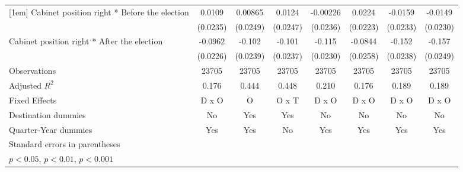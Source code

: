 \begin{table}[htbp]
\begin{tabular}{l*{7}{c}}
[1em]
Cabinet position right * Before the election&      0.0109         &     0.00865         &      0.0124         &    -0.00226         &      0.0224         &     -0.0159         &     -0.0149         \\
                    &    (0.0235)         &    (0.0249)         &    (0.0247)         &    (0.0236)         &    (0.0223)         &    (0.0233)         &    (0.0230)         \\
[1em]
Cabinet position right * After the election&     -0.0962\sym{***}&      -0.102\sym{***}&      -0.101\sym{***}&      -0.115\sym{***}&     -0.0844\sym{**} &      -0.152\sym{***}&      -0.157\sym{***}\\
                    &    (0.0226)         &    (0.0239)         &    (0.0237)         &    (0.0230)         &    (0.0258)         &    (0.0238)         &    (0.0249)         \\
\hline
Observations        &       23705         &       23705         &       23705         &       23705         &       23705         &       23705         &       23705         \\
Adjusted \(R^{2}\)  &       0.176         &       0.444         &       0.448         &       0.210         &       0.176         &       0.189         &       0.189         \\
Fixed Effects       &       D x O         &           O         &       O x T         &       D x O         &       D x O         &       D x O         &       D x O         \\
Destination dummies &          No         &         Yes         &         Yes         &          No         &          No         &          No         &          No         \\
Quarter-Year dummies&         Yes         &         Yes         &          No         &         Yes         &         Yes         &         Yes         &         Yes         \\
\hline\hline
\multicolumn{8}{l}{\footnotesize Standard errors in parentheses}\\
\multicolumn{8}{l}{\footnotesize \sym{*} \(p<0.05\), \sym{**} \(p<0.01\), \sym{***} \(p<0.001\)}\\
\end{tabular}
\end{table}
